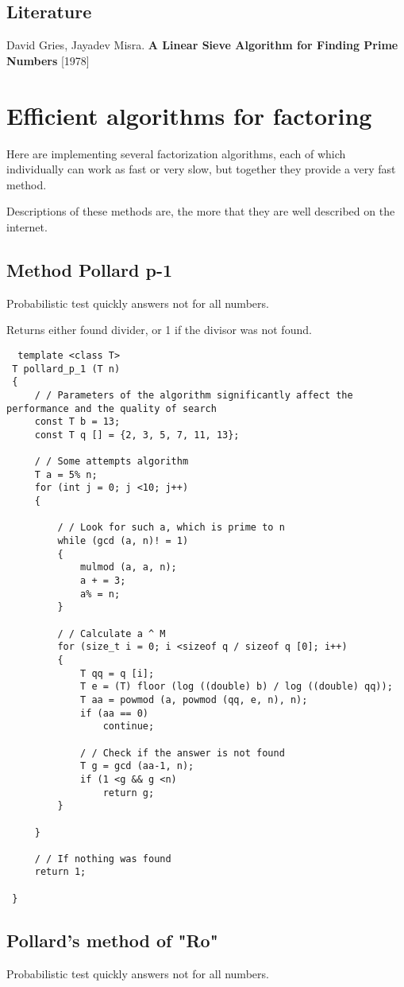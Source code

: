 \subsection{ Literature }

David Gries, Jayadev Misra. \textbf{A Linear Sieve Algorithm for Finding Prime Numbers} [1978]

\section{ Efficient algorithms for factoring }
Here are implementing several factorization algorithms, each of which individually can work as fast or very slow, but together they provide a very fast method.

Descriptions of these methods are, the more that they are well described on the internet.

\subsection{ Method Pollard p-1 }
Probabilistic test quickly answers not for all numbers.

Returns either found divider, or 1 if the divisor was not found.

\begin{verbatim}  template <class T>
 T pollard_p_1 (T n)
 {
     / / Parameters of the algorithm significantly affect the performance and the quality of search
     const T b = 13;
     const T q [] = {2, 3, 5, 7, 11, 13};

     / / Some attempts algorithm
     T a = 5% n;
     for (int j = 0; j <10; j++)
     {

         / / Look for such a, which is prime to n
         while (gcd (a, n)! = 1)
         {
             mulmod (a, a, n);
             a + = 3;
             a% = n;
         }

         / / Calculate a ^ M
         for (size_t i = 0; i <sizeof q / sizeof q [0]; i++)
         {
             T qq = q [i];
             T e = (T) floor (log ((double) b) / log ((double) qq));
             T aa = powmod (a, powmod (qq, e, n), n);
             if (aa == 0)
                 continue;
            
             / / Check if the answer is not found
             T g = gcd (aa-1, n);
             if (1 <g && g <n)
                 return g;
         }

     }

     / / If nothing was found
     return 1;

 } 
\end{verbatim}\subsection{ Pollard's method of "Ro" }
Probabilistic test quickly answers not for all numbers.

